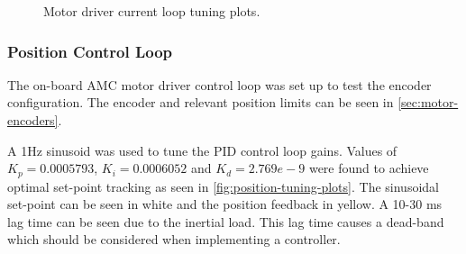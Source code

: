 \begin{figure}
\centering
{}
\caption{Motor driver current loop tuning plots.}
\label{fig:current-tuning-plots}
\end{figure}

\subsubsection{Position Control Loop}
The on-board AMC motor driver control loop was set up to test the encoder configuration. The encoder and relevant position limits can be seen in \cref{sec:motor-encoders}. 

A 1Hz sinusoid was used to tune the PID control loop gains. Values of $K_p = 0.0005793$, $K_i = 0.0006052$ and $K_d = 2.769e-9$ were found to achieve optimal set-point tracking as seen in \cref{fig:position-tuning-plots}. The sinusoidal set-point can be seen in white and the position feedback in yellow. A 10-30 ms lag time can be seen due to the inertial load. This lag time causes a dead-band which should be considered when implementing a controller. 

